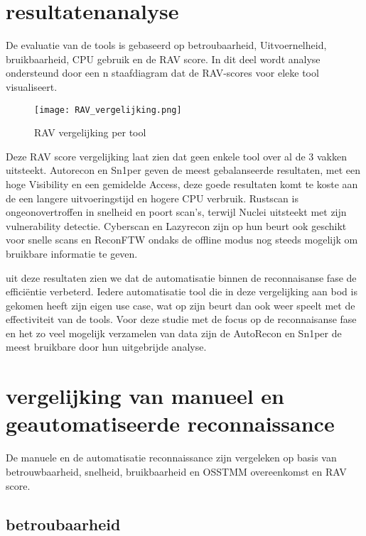 \section{resultatenanalyse}

De evaluatie van de tools is gebaseerd op betroubaarheid, Uitvoernelheid, bruikbaarheid, CPU gebruik en de RAV score. 
In dit deel wordt analyse ondersteund door een n staafdiagram dat de RAV-scores voor eleke tool visualiseert.  

\begin{figure}[H] 
\centering
\texttt{[image: RAV\_vergelijking.png]}
\caption{RAV vergelijking per tool}
\label{fig:rav_barplot}
\end{figure}

Deze RAV score vergelijking laat zien dat geen enkele tool over al de 3 vakken uitsteekt. 
Autorecon en Sn1per geven de meest gebalanseerde resultaten, met een hoge Visibility en een gemidelde Access, deze goede resultaten komt te koste aan de een langere uitvoeringstijd en hogere CPU verbruik.
Rustscan is ongeonovertroffen in snelheid en poort scan's, terwijl Nuclei uitsteekt met zijn vulnerability detectie.
Cyberscan en Lazyrecon zijn op hun beurt ook geschikt voor snelle scans en ReconFTW ondaks de offline modus nog steeds mogelijk om bruikbare informatie te geven. 

uit deze resultaten zien we dat de automatisatie binnen de reconnaisanse fase de efficiëntie verbeterd. 
Iedere automatisatie tool die in deze vergelijking aan bod is gekomen heeft zijn eigen use case, wat op zijn beurt dan ook weer speelt met de effectiviteit van de tools.
Voor deze studie met de focus op de reconnaisanse fase en het zo veel mogelijk verzamelen van data zijn de AutoRecon en Sn1per de meest bruikbare door hun uitgebrijde analyse.

\section{vergelijking van manueel en geautomatiseerde reconnaissance}
De manuele en de automatisatie reconnaissance zijn vergeleken op basis van betrouwbaarheid, snelheid, bruikbaarheid en OSSTMM overeenkomst en RAV score.
\subsection{betroubaarheid}

